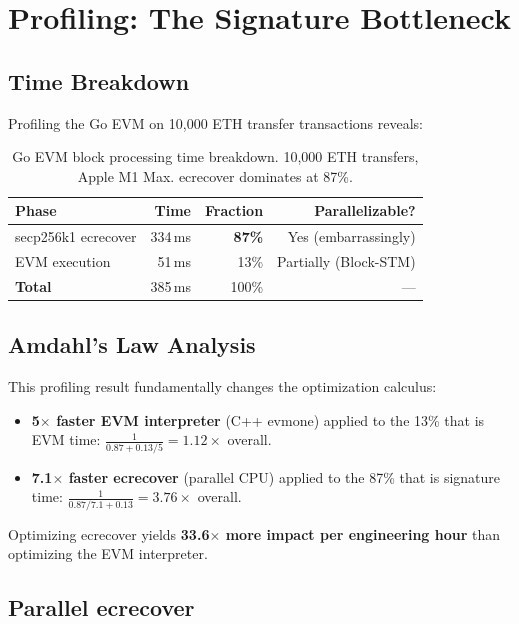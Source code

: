 \section{Profiling: The Signature Bottleneck}


\subsection{Time Breakdown}

Profiling the Go EVM on 10{,}000 ETH transfer transactions reveals:

\begin{table}[h]
\centering
\small
\begin{tabular}{lrrr}
\toprule
\textbf{Phase} & \textbf{Time} & \textbf{Fraction} & \textbf{Parallelizable?} \\
\midrule
secp256k1 ecrecover & 334\,ms & \textbf{87\%} & Yes (embarrassingly) \\
EVM execution       & 51\,ms  & 13\%          & Partially (Block-STM) \\
\midrule
\textbf{Total}      & 385\,ms & 100\%         & --- \\
\bottomrule
\end{tabular}
\caption{Go EVM block processing time breakdown. 10{,}000 ETH transfers,
Apple M1 Max. ecrecover dominates at 87\%.}
\label{tab:profile}
\end{table}

\subsection{Amdahl's Law Analysis}

This profiling result fundamentally changes the optimization calculus:

\begin{itemize}
\item \textbf{5$\times$ faster EVM interpreter} (C++ evmone) applied to the 13\% that is
      EVM time:
      $\frac{1}{0.87 + 0.13/5} = 1.12\times$ overall.
\item \textbf{7.1$\times$ faster ecrecover} (parallel CPU) applied to the 87\% that is
      signature time:
      $\frac{1}{0.87/7.1 + 0.13} = 3.76\times$ overall.
\end{itemize}

Optimizing ecrecover yields \textbf{33.6$\times$ more impact per engineering hour} than
optimizing the EVM interpreter.

\subsection{Parallel ecrecover}

